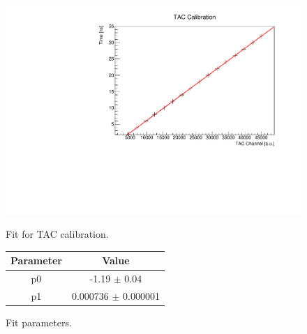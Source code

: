 \documentclass[a4paper,11pt]{article}
\begin{document}
\begin{figure}[h!]
\begin{minipage}[b]{0.6\textwidth}
\centering
\includegraphics[scale=0.4]{fit_calibrazione_tac}
\caption{Fit for TAC calibration.}
\end{minipage}
\hfill
\begin{minipage}[b]{0.45\textwidth}
\centering
\begin{tabular}{cc}
\toprule
\toprule
Parameter & Value \\
\midrule
p0     & -1.19 $\pm$  0.04 \\
p1     &  0.000736   $\pm$  0.000001\\
\bottomrule
\bottomrule
\end{tabular}
\vspace{1.5cm}
\caption{Fit parameters.}

\end{minipage}
\end{figure}
\end{document}
